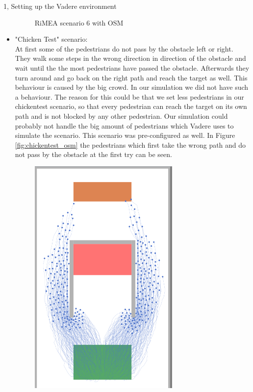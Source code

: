 \documentclass[10pt,a4paper]{article}
\begin{document}
\begin{task}{1, Setting up the Vadere environment}
\begin{itemize}
\begin{figure}[H]
        \caption{RiMEA scenario 6 with OSM}
        \label{fig:rimea6_osm}
    \end{figure}
    \item "Chicken Test" scenario: \\
    At first some of the pedestrians do not pass by the obstacle left or right. They walk some steps in the wrong direction in direction of the obstacle and wait until the the most pedestrians have passed the obstacle. Afterwards they turn around and go back on the right path and reach the target as well. This behaviour is caused by the big crowd. In our simulation we did not have such a behaviour. The reason for this could be that we set less pedestrians in our chickentest scenario, so that every pedestrian can reach the target on its own path and is not blocked by any other pedestrian. Our simulation could probably not handle the big amount of pedestrians which Vadere uses to simulate the scenario. This scenario was pre-configured as well. In Figure \ref{fig:chickentest_osm} the pedestrians which first take the wrong path and do not pass by the obstacle at the first try can be seen.
    \begin{figure}[H]
        \centering
        \includegraphics[width=0.7\textwidth]{pictures/osm/chickentest.png}

\end{figure}
\end{itemize}
\end{task}
\end{document}
